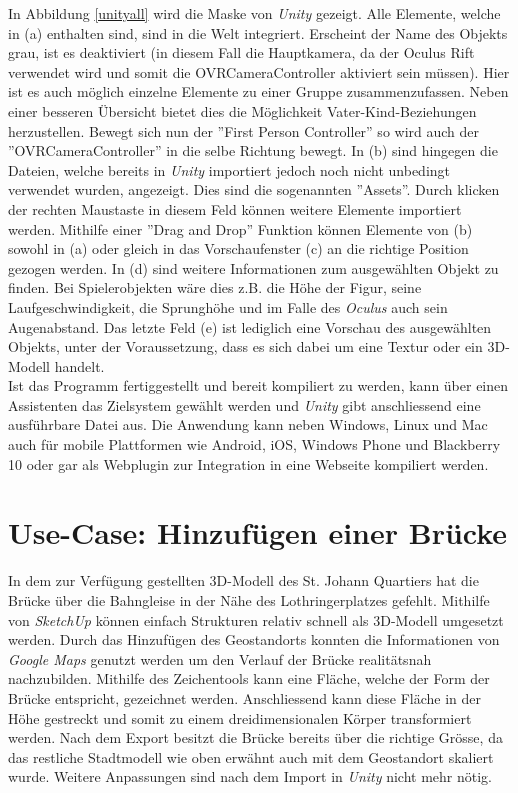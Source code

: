  In Abbildung \ref{unityall} wird die Maske von \textit{Unity} gezeigt. Alle Elemente, welche in (a) enthalten sind, sind in die Welt integriert. Erscheint der Name des Objekts grau, ist es deaktiviert (in diesem Fall die Hauptkamera, da der Oculus Rift verwendet wird und somit die OVRCameraController aktiviert sein müssen). Hier ist es auch möglich einzelne Elemente zu einer Gruppe zusammenzufassen. Neben einer besseren Übersicht bietet dies die Möglichkeit Vater-Kind-Beziehungen herzustellen. Bewegt sich nun der ''First Person Controller'' so wird auch der ''OVRCameraController'' in die selbe Richtung bewegt. In (b) sind hingegen die Dateien, welche bereits in \textit{Unity} importiert jedoch noch nicht unbedingt verwendet wurden, angezeigt. Dies sind die sogenannten ''Assets''. Durch klicken der rechten Maustaste in diesem Feld können weitere Elemente importiert werden. Mithilfe einer ''Drag and Drop'' Funktion können Elemente von (b) sowohl in (a) oder gleich in das Vorschaufenster (c) an die richtige Position gezogen werden. In (d) sind weitere Informationen zum ausgewählten Objekt zu finden. Bei Spielerobjekten wäre dies z.B. die Höhe der Figur, seine Laufgeschwindigkeit, die Sprunghöhe und im Falle des \textit{Oculus} auch sein Augenabstand. Das letzte Feld (e) ist lediglich eine Vorschau des ausgewählten Objekts, unter der Voraussetzung, dass es sich dabei um eine Textur oder ein 3D-Modell handelt.\\[6pt]
 Ist das Programm fertiggestellt und bereit kompiliert zu werden, kann über einen Assistenten das Zielsystem gewählt werden und \textit{Unity} gibt anschliessend eine ausführbare Datei aus. Die Anwendung kann neben Windows, Linux und Mac auch für mobile Plattformen wie Android, iOS, Windows Phone und Blackberry 10 oder gar als Webplugin zur Integration in eine Webseite kompiliert werden.

\section{Use-Case: Hinzufügen einer Brücke}\label{s.brücke}
In dem zur Verfügung gestellten 3D-Modell des St. Johann Quartiers hat die Brücke über die Bahngleise in der Nähe des Lothringerplatzes gefehlt. Mithilfe von \textit{SketchUp} können einfach Strukturen relativ schnell als 3D-Modell umgesetzt werden. Durch das Hinzufügen des Geostandorts konnten die Informationen von \textit{Google Maps} genutzt werden um den Verlauf der Brücke realitätsnah nachzubilden. Mithilfe des Zeichentools kann eine Fläche, welche der Form der Brücke entspricht, gezeichnet werden. Anschliessend kann diese Fläche in der Höhe gestreckt und somit zu einem dreidimensionalen Körper transformiert werden. Nach dem Export besitzt die Brücke bereits über die richtige Grösse, da das restliche Stadtmodell wie oben erwähnt auch mit dem Geostandort skaliert wurde. Weitere Anpassungen sind nach dem Import in \textit{Unity} nicht mehr nötig.\\[6pt]

